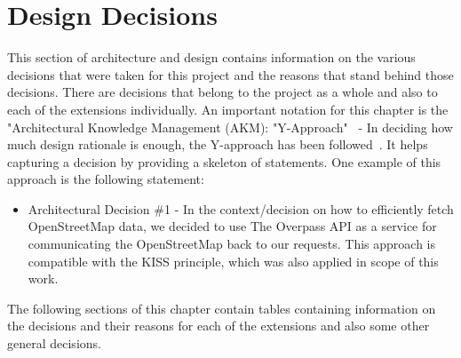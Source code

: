 \section{Design Decisions}
This section of architecture and design contains information on the various decisions that were taken for this project and the reasons that stand behind those decisions.
There are decisions that belong to the project as a whole and also to each of the extensions individually.
\newline
An important notation for this chapter is the "Architectural Knowledge Management (AKM): "Y-Approach"~\cite{AKMHomepage} - In deciding how much design rationale is enough, the Y-approach has been followed~\cite{YApproach}. It helps capturing a decision by providing a skeleton of statements. One example of this approach is the following statement:
\begin{itemize}
	\item Architectural Decision \#1 - In the context/decision on how to efficiently fetch OpenStreetMap data, we decided to use The Overpass API as a service for communicating the OpenStreetMap back to our requests. This approach is compatible with the KISS principle, which was also applied in scope of this work.
\end{itemize}
The following sections of this chapter contain tables containing information on the decisions and their reasons for each of the extensions and also some other general decisions.
\pagebreak
